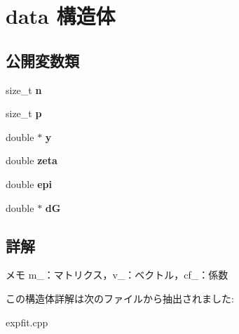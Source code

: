 \hypertarget{structdata}{}\section{data 構造体}
\label{structdata}
\subsection*{公開変数類}
\begin{DoxyCompactItemize}
\item 
size\+\_\+t {\bfseries n}\hypertarget{structdata_a863315834546871751e3ba1a50bab1d3}{}\label{structdata_a863315834546871751e3ba1a50bab1d3}

\item 
size\+\_\+t {\bfseries p}\hypertarget{structdata_a353254e59fc407392faceb745252552e}{}\label{structdata_a353254e59fc407392faceb745252552e}

\item 
double $\ast$ {\bfseries y}\hypertarget{structdata_a0bf63f10cc3224d34be31019ae11c002}{}\label{structdata_a0bf63f10cc3224d34be31019ae11c002}

\item 
double {\bfseries zeta}\hypertarget{structdata_a3d9bbdc0571e5e9ca21c7de38e0ef150}{}\label{structdata_a3d9bbdc0571e5e9ca21c7de38e0ef150}

\item 
double {\bfseries epi}\hypertarget{structdata_a51f22ad0bbd52c6b50fb998a8071d848}{}\label{structdata_a51f22ad0bbd52c6b50fb998a8071d848}

\item 
double $\ast$ {\bfseries dG}\hypertarget{structdata_a6d463a2336116e520eefd42a57b0d9bf}{}\label{structdata_a6d463a2336116e520eefd42a57b0d9bf}

\end{DoxyCompactItemize}


\subsection{詳解}
メモ m\+\_\+：マトリクス，v\+\_\+：ベクトル，cf\+\_\+：係数 

この構造体詳解は次のファイルから抽出されました\+:\begin{DoxyCompactItemize}
\item 
expfit.\+cpp\end{DoxyCompactItemize}

